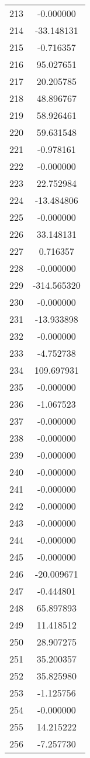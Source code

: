 \documentclass[12pt]{article}
\begin{document}
\begin{longtable}{@{}cc@{}}
213 & -0.000000 \\
214 & -33.148131 \\
215 & -0.716357 \\
216 & 95.027651 \\
217 & 20.205785 \\
218 & 48.896767 \\
219 & 58.926461 \\
220 & 59.631548 \\
221 & -0.978161 \\
222 & -0.000000 \\
223 & 22.752984 \\
224 & -13.484806 \\
225 & -0.000000 \\
226 & 33.148131 \\
227 & 0.716357 \\
228 & -0.000000 \\
229 & -314.565320 \\
230 & -0.000000 \\
231 & -13.933898 \\
232 & -0.000000 \\
233 & -4.752738 \\
234 & 109.697931 \\
235 & -0.000000 \\
236 & -1.067523 \\
237 & -0.000000 \\
238 & -0.000000 \\
239 & -0.000000 \\
240 & -0.000000 \\
241 & -0.000000 \\
242 & -0.000000 \\
243 & -0.000000 \\
244 & -0.000000 \\
245 & -0.000000 \\
246 & -20.009671 \\
247 & -0.444801 \\
248 & 65.897893 \\
249 & 11.418512 \\
250 & 28.907275 \\
251 & 35.200357 \\
252 & 35.825980 \\
253 & -1.125756 \\
254 & -0.000000 \\
255 & 14.215222 \\
256 & -7.257730 \\

\end{longtable}
\end{document}
